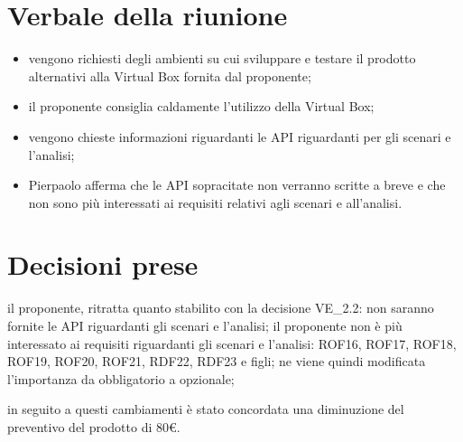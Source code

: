 \documentclass[a4paper,11pt]{article}
\begin{document}
	\section{Verbale della riunione}
	\begin{itemize}
		\item vengono richiesti degli ambienti su cui sviluppare e testare il prodotto alternativi alla Virtual Box fornita dal proponente;
		\item il proponente consiglia caldamente l'utilizzo della Virtual Box;
		\item vengono chieste informazioni riguardanti le API riguardanti per gli scenari e l'analisi;
		\item Pierpaolo afferma che le API sopracitate non verranno scritte a breve e che non sono più interessati ai requisiti relativi agli scenari e all'analisi.
	\end{itemize}
	\section{Decisioni prese}
	\begin{itemize}
		\itemVE il proponente, ritratta quanto stabilito con la decisione VE\_2.2: non saranno fornite le API riguardanti gli scenari e l'analisi;
		\itemVE il proponente non è più interessato ai requisiti riguardanti gli scenari e l'analisi: ROF16, ROF17, ROF18, ROF19, ROF20, ROF21, RDF22, RDF23 e figli; ne viene quindi modificata l'importanza da obbligatorio a opzionale;

		\itemVE in seguito a questi cambiamenti è stato concordata una diminuzione del preventivo del prodotto di 80€.
	\end{itemize}
\end{document}
